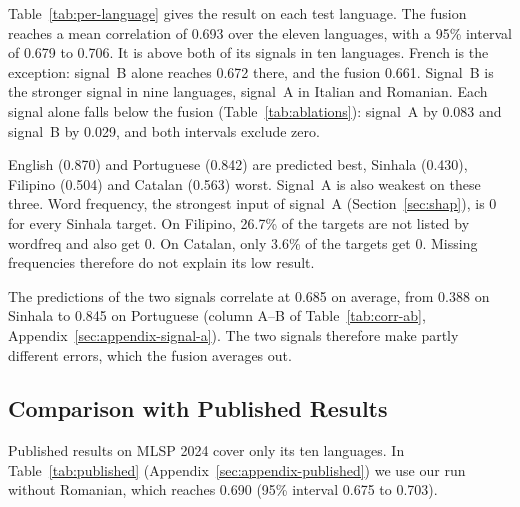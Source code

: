 \documentclass[11pt]{article}
\begin{document}
Table~\ref{tab:per-language} gives the result on each test language. The fusion reaches a
mean correlation of 0.693 over the eleven languages, with a 95\% interval of 0.679 to 0.706. %
It is above both of its signals in ten languages. French is the exception: signal~B alone reaches
0.672 there, and the fusion 0.661. Signal~B is the stronger signal in nine languages, signal~A in %
Italian and Romanian. Each signal alone falls below the fusion (Table~\ref{tab:ablations}): signal~A %
by 0.083 and signal~B by 0.029, and both intervals exclude zero.

English (0.870) and Portuguese (0.842) are predicted best, Sinhala (0.430), Filipino (0.504) and %
Catalan (0.563) worst. Signal~A is also weakest on these three. Word frequency, the strongest %
input of signal~A (Section~\ref{sec:shap}), is 0 for every Sinhala target. On Filipino, 26.7\% of %
the targets are not listed by wordfreq and also get 0. On Catalan, only 3.6\% of the targets get %
0. Missing
frequencies therefore do not explain its low result.

The predictions of the two signals correlate at 0.685 on average, from 0.388 on Sinhala to 0.845 %
on Portuguese (column A--B of Table~\ref{tab:corr-ab}, Appendix~\ref{sec:appendix-signal-a}). The
two signals therefore make partly different errors, which the fusion averages out.

\subsection{Comparison with Published Results}
\label{sec:published}

Published results on MLSP 2024 cover only its ten languages. In Table~\ref{tab:published} %
(Appendix~\ref{sec:appendix-published}) we use our run without Romanian, which reaches 0.690 (95\%
interval 0.675 to 0.703).
\end{document}
